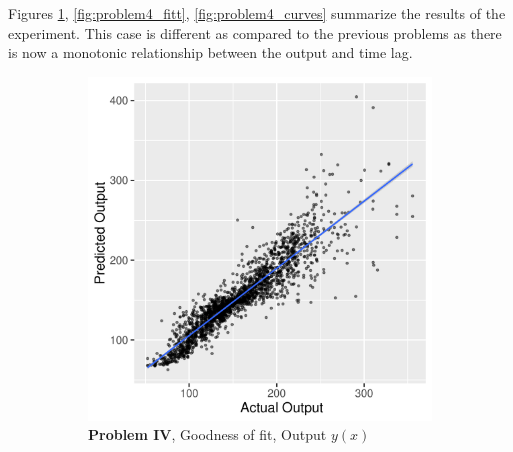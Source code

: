 \documentclass[envcountsect,runningheads]{llncs}
\theoremstyle{etoile}
\begin{document}
Figures \ref{fig:problem4_fitv}, \ref{fig:problem4_fitt}, \ref{fig:problem4_curves} summarize 
the results of the experiment. This case is different as compared to the previous problems as there 
is now a monotonic relationship between the output and time lag. %



\begin{figure}
  \centering

  \begin{subfigure}[b]{0.4\textwidth}
    \centering
    \includegraphics[width=\textwidth]{figures/exp4_scatter_v_test}
    \caption{ \textbf{Problem IV}, Goodness of fit, Output $y(x)$}
    \label{fig:problem4_fitv}
  \end{subfigure}
  \hfill
  \begin{subfigure}[b]{0.4\textwidth}
    \centering

\end{subfigure}
\end{figure}
\end{document}
